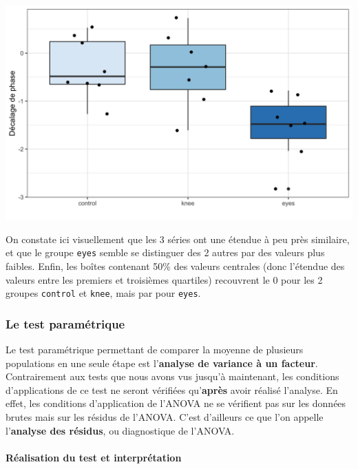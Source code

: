 \documentclass[a4paperpaper,]{article}
\let\oldparagraph\paragraph
\renewcommand{\paragraph}[1]{\oldparagraph{#1}\mbox{}}
\begin{document}
\begin{center}\includegraphics[width=0.9\linewidth]{figure/unnamed-chunk-77-1} \end{center}

On constate ici visuellement que les 3 séries ont une étendue à peu près similaire, et que le groupe \texttt{eyes} semble se distinguer des 2 autres par des valeurs plus faibles. Enfin, les boîtes contenant 50\% des valeurs centrales (donc l'étendue des valeurs entre les premiers et troisièmes quartiles) recouvrent le 0 pour les 2 groupes \texttt{control} et \texttt{knee}, mais par pour \texttt{eyes}.

\hypertarget{le-test-parametrique-3}{%
\subsubsection{Le test paramétrique}\label{le-test-parametrique-3}}

Le test paramétrique permettant de comparer la moyenne de plusieurs populations en une seule étape est l'\textbf{analyse de variance à un facteur}. Contrairement aux tests que nous avons vus jusqu'à maintenant, les conditions d'applications de ce test ne seront vérifiées qu'\textbf{après} avoir réalisé l'analyse. En effet, les conditions d'application de l'ANOVA ne se vérifient pas sur les données brutes mais sur les résidus de l'ANOVA. C'est d'ailleurs ce que l'on appelle l'\textbf{analyse des résidus}, ou diagnostique de l'ANOVA.

\hypertarget{realisation-du-test-et-interpretation-3}{%
\paragraph{Réalisation du test et interprétation}\label{realisation-du-test-et-interpretation-3}}
\end{document}
